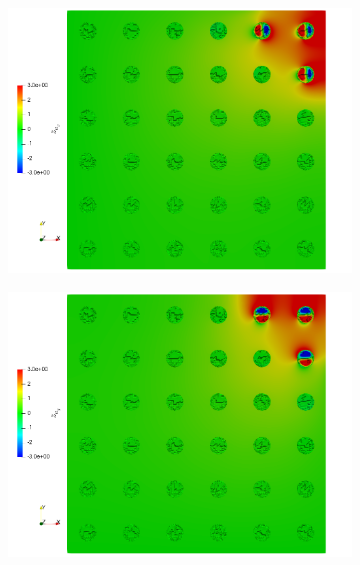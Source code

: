 \begin{figure}[ht!]
\centering
\begin{subfigure}{.33\textwidth}
\centering
\includegraphics[width=.99\linewidth]{img/aut_solder_zux.png}
\end{subfigure}%
\begin{subfigure}{0.33\textwidth}
\centering
\includegraphics[width=.99\linewidth]{img/aut_solder_zuy.png}
\end{subfigure}%
\begin{subfigure}{0.33\textwidth}
\centering

\end{subfigure}
\end{figure}
